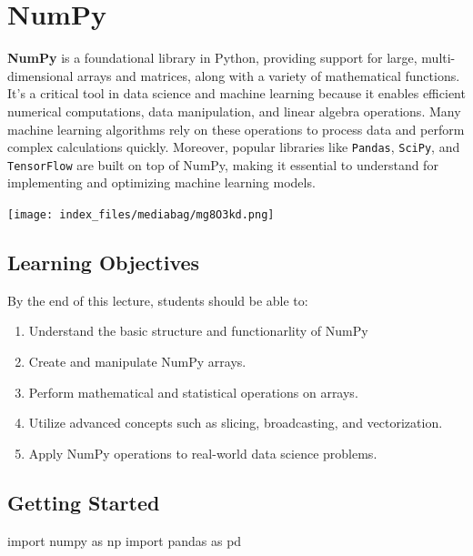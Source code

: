 \documentclass[
  letterpaper,
  DIV=11,
  numbers=noendperiod]{scrreprt}
\newenvironment{Shaded}{\begin{snugshade}}{\end{snugshade}}
\newcommand{\ImportTok}[1]{\textcolor[rgb]{0.00,0.46,0.62}{#1}}
\newcommand{\NormalTok}[1]{\textcolor[rgb]{0.00,0.23,0.31}{#1}}
\providecommand{\tightlist}{%
  \setlength{\itemsep}{0pt}\setlength{\parskip}{0pt}}\usepackage{longtable,booktabs,array}
\begin{document}
\hypertarget{numpy}{%
\chapter{NumPy}\label{numpy}}

\textbf{NumPy} is a foundational library in Python, providing support
for large, multi-dimensional arrays and matrices, along with a variety
of mathematical functions. It's a critical tool in data science and
machine learning because it enables efficient numerical computations,
data manipulation, and linear algebra operations. Many machine learning
algorithms rely on these operations to process data and perform complex
calculations quickly. Moreover, popular libraries like \texttt{Pandas},
\texttt{SciPy}, and \texttt{TensorFlow} are built on top of NumPy,
making it essential to understand for implementing and optimizing
machine learning models.

\texttt{[image: index\_files/mediabag/mg8O3kd.png]}

\hypertarget{learning-objectives}{%
\section{Learning Objectives}\label{learning-objectives}}

By the end of this lecture, students should be able to:

\begin{enumerate}
\def\labelenumi{\arabic{enumi}.}
\tightlist
\item
  Understand the basic structure and functionarlity of NumPy
\item
  Create and manipulate NumPy arrays.
\item
  Perform mathematical and statistical operations on arrays.
\item
  Utilize advanced concepts such as slicing, broadcasting, and
  vectorization.
\item
  Apply NumPy operations to real-world data science problems.
\end{enumerate}

\hypertarget{getting-started}{%
\section{Getting Started}\label{getting-started}}

\begin{Shaded}
\begin{Highlighting}[]

\ImportTok{import}\NormalTok{ numpy }\ImportTok{as}\NormalTok{ np}
\ImportTok{import}\NormalTok{ pandas }\ImportTok{as}\NormalTok{ pd}
\end{Highlighting}
\end{Shaded}
\end{document}
